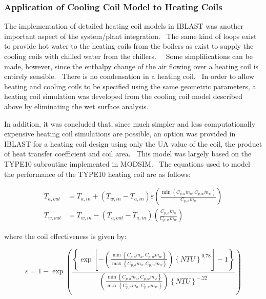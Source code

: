 \subsubsection{Application of Cooling Coil Model to Heating Coils}\label{application-of-cooling-coil-model-to-heating-coils}

The implementation of detailed heating coil models in IBLAST was another important aspect of the system/plant integration.~ The same kind of loops exist to provide hot water to the heating coils from the boilers as exist to supply the cooling coils with chilled water from the chillers.~~ Some simplifications can be made, however, since the enthalpy change of the air flowing over a heating coil is entirely sensible.~ There is no condensation in a heating coil.~ In order to allow heating and cooling coils to be specified using the same geometric parameters, a heating coil simulation was developed from the cooling coil model described above by eliminating the wet surface analysis.

In addition, it was concluded that, since much simpler and less computationally expensive heating coil simulations are possible, an option was provided in IBLAST for a heating coil design using only the UA value of the coil, the product of heat transfer coefficient and coil area.~ This model was largely based on the TYPE10 subroutine implemented in MODSIM.~ The equations used to model the performance of the TYPE10 heating coil are as follows:

\begin{equation}
  \begin{array}{rl} 
    T_{a,out} & = T_{a,in} + \left( T_{w,in} - T_{a,in} \right) \varepsilon \left( \frac{\min \left( C_{p,a} \dot m_a,C_{p,w}\dot m_w \right)} {C_{p,a}\dot m_a} \right) \\
    T_{w,out} & = T_{w,in} - \left( T_{a,out} - T_{a,in} \right) \left( \frac{C_{p,a}\dot m_a}{C_{p,w}\dot m_w} \right)
  \end{array}
\end{equation}

where the coil effectiveness is given by:

\begin{equation}
\varepsilon  = 1 - \exp \left( {\frac{{\left\{ {\exp \left[ { - \left( {\frac{{\min \left\{ {{C_{p,a}}{{\dot m}_a},{C_{p,w}}{{\dot m}_w}} \right\}}}{{\max \left\{ {{C_{p,a}}{{\dot m}_a},{C_{p,w}}{{\dot m}_w}} \right\}}}} \right){{\left\{ {NTU} \right\}}^{0.78}}} \right] - 1} \right\}}}{{\left( {\frac{{\min \left\{ {{C_{p,a}}{{\dot m}_a},{C_{p,w}}{{\dot m}_w}} \right\}}}{{\max \left\{ {{C_{p,a}}{{\dot m}_a},{C_{p,w}}{{\dot m}_w}} \right\}}}} \right){{\left\{ {NTU} \right\}}^{ - .22}}}}} \right)
\end{equation}

